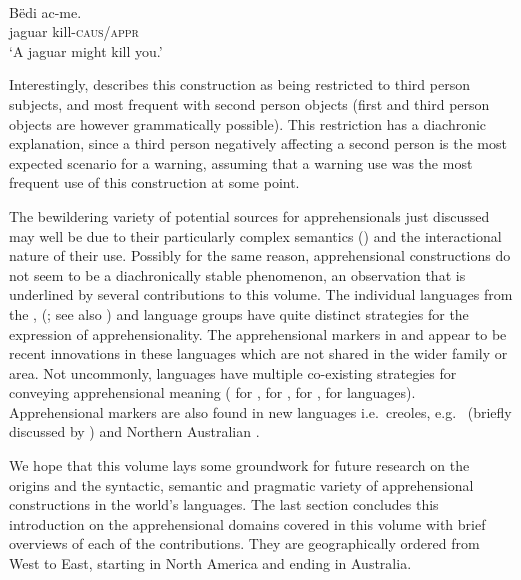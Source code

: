 \documentclass[output=paper,colorlinks,citecolor=brown]{langscibook}
\begin{document}
\ea \label{ex:intro27} 
\\
\gll Bëdi ac-me. \\
jaguar kill-\textsc{caus/appr} \\
\glt `A jaguar might kill you.' 
\z

\noindent Interestingly, \citet[443]{fleck2003} describes this construction as being restricted to third person subjects, and most frequent with second person objects (first and third person objects are however grammatically possible). This restriction has a diachronic explanation, since a third person negatively affecting a second person is the most expected scenario for a warning, assuming that a warning use was the most frequent use of this construction at some point.

The bewildering variety of potential sources for apprehensionals just discussed may well be due to their particularly complex semantics (\cite{kutevaetal2019,anderboisdabkowskiupcoming}) and the interactional nature of their use. Possibly for the same reason, apprehensional constructions do not seem to be a diachronically stable phenomenon, an observation that is underlined by several contributions to this volume. The individual languages from the  \citep{chapters/browne},  (\citealt{chapters/francois}; see also \cite{smithdennis2021}) and  \citep{chapters/daniel} language groups have quite distinct strategies for the expression of apprehensionality. The apprehensional markers in  \citep{chapters/fedotov} and  \citep{chapters/treis} appear to be recent innovations in these languages which are not shared in the wider family or area. Not uncommonly, languages have multiple co-existing strategies for conveying apprehensional meaning (\citealt{chapters/francez} for , \citealt{chapters/lahaussois} for , \citealt{chapters/rhee-kuteva} for ,  \citealt{chapters/wiemer} for  languages). Apprehensional markers are also found in new languages i.e.\ creoles, e.g.\  (briefly discussed by \cite{smithdennis2021}) and Northern Australian  \citep{angeloschultzeberndt2016, phillips2021}.


We hope that this volume lays some groundwork for future research on the origins and the syntactic, semantic and pragmatic variety of apprehensional constructions in the world's languages. The last section concludes this introduction on the apprehensional domains covered in this volume with brief overviews of each of the contributions. They are geographically ordered from West to East, starting in North America and ending in Australia.
\end{document}
